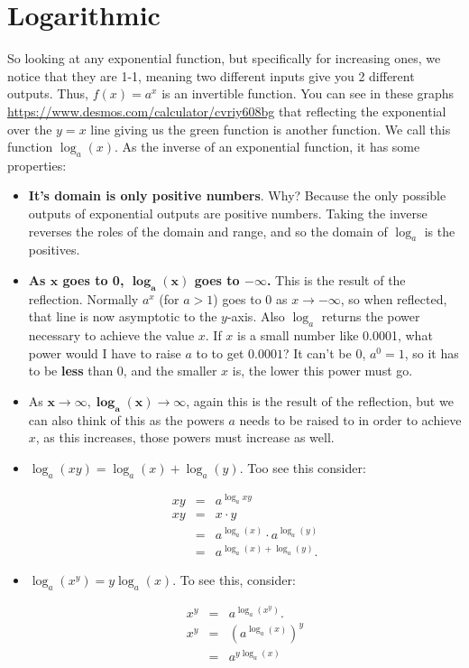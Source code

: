 \documentclass[10pt]{article}
\theoremstyle{definition}
\begin{document}
\section{Logarithmic}

So looking at any exponential function, but specifically for increasing ones, we notice that they are 1-1, meaning two different inputs give you 2 different outputs.  Thus, $f(x)=a^x$ is an invertible function.  You can see in these graphs \url{https://www.desmos.com/calculator/cvriy608bg} that reflecting the exponential over the $y=x$ line giving us the green function is another function.  We call this function $\log_a(x)$.  As the inverse of an exponential function, it has some properties:

\begin{itemize}
\item \textbf{It's domain is only positive numbers}.  Why?  Because the only possible outputs of exponential outputs are positive numbers.  Taking the inverse reverses the roles of the domain and range, and so the domain of $\log_a$ is the positives.
\item \textbf{As $\mathbf{x}$ goes to 0, $ \mathbf{\log_a(x)}$ goes to $\mathbf{-\infty}$.}   This is the result of the reflection.  Normally $a^x$ (for $a>1$) goes to 0 as $x\to -\infty$, so when reflected, that line is now asymptotic to the $y$-axis.  Also $\log_a$ returns the power necessary to achieve the value $x$.  If $x$ is a small number like 0.0001, what power would I have to raise $a$ to to get $0.0001$?  It can't be 0, $a^0=1$, so it has to be \textbf{less} than 0, and the smaller $x$ is, the lower this power must go.

\item  As $\mathbf{x\to\infty, \log_a(x)\to \infty}$, again this is the result  of the reflection, but we can also think of this as the powers $a$ needs to be raised to in order to achieve $x$, as this increases, those powers must increase as well.

\item $\log_a(xy)=\log_a(x)+\log_a(y)$. Too see this consider:

\begin{eqnarray*}
xy&=&a^{\log_a{xy}}\\
xy&=&x\cdot y\\
&=&a^{\log_a(x)}\cdot a^{\log_a(y)}\\
&=&a^{\log_a(x)+\log_a(y)}.
\end{eqnarray*}


\item $\log_a(x^y)=y\log_a(x)$.  To see this, consider:

\begin{eqnarray*}
x^y&=&a^{\log_a(x^y)}.\\
x^y&=&(a^{\log_a(x)})^y\\
&=&a^{y\log_a(x)}
\end{eqnarray*}



\end{itemize}
\end{document}
